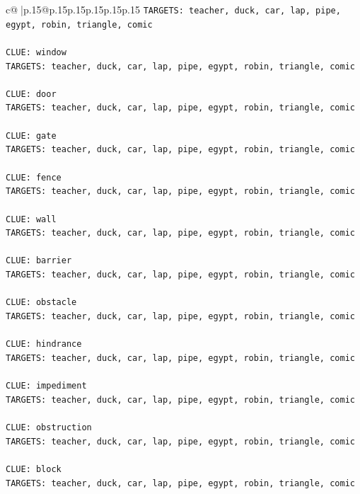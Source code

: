 \documentclass{article}
\begin{document}
{\begin{supertabular}{c@{$\;$}|p{.15\linewidth}@{}p{.15\linewidth}p{.15\linewidth}p{.15\linewidth}p{.15\linewidth}p{.15\linewidth}}
{{{\texttt{TARGETS: teacher, duck, car, lap, pipe, egypt, robin, triangle, comic} \\
\\ 
\texttt{CLUE: window} \\
\texttt{TARGETS: teacher, duck, car, lap, pipe, egypt, robin, triangle, comic} \\
\\ 
\texttt{CLUE: door} \\
\texttt{TARGETS: teacher, duck, car, lap, pipe, egypt, robin, triangle, comic} \\
\\ 
\texttt{CLUE: gate} \\
\texttt{TARGETS: teacher, duck, car, lap, pipe, egypt, robin, triangle, comic} \\
\\ 
\texttt{CLUE: fence} \\
\texttt{TARGETS: teacher, duck, car, lap, pipe, egypt, robin, triangle, comic} \\
\\ 
\texttt{CLUE: wall} \\
\texttt{TARGETS: teacher, duck, car, lap, pipe, egypt, robin, triangle, comic} \\
\\ 
\texttt{CLUE: barrier} \\
\texttt{TARGETS: teacher, duck, car, lap, pipe, egypt, robin, triangle, comic} \\
\\ 
\texttt{CLUE: obstacle} \\
\texttt{TARGETS: teacher, duck, car, lap, pipe, egypt, robin, triangle, comic} \\
\\ 
\texttt{CLUE: hindrance} \\
\texttt{TARGETS: teacher, duck, car, lap, pipe, egypt, robin, triangle, comic} \\
\\ 
\texttt{CLUE: impediment} \\
\texttt{TARGETS: teacher, duck, car, lap, pipe, egypt, robin, triangle, comic} \\
\\ 
\texttt{CLUE: obstruction} \\
\texttt{TARGETS: teacher, duck, car, lap, pipe, egypt, robin, triangle, comic} \\
\\ 
\texttt{CLUE: block} \\
\texttt{TARGETS: teacher, duck, car, lap, pipe, egypt, robin, triangle, comic} \\
}}}
\end{supertabular}}
\end{document}
